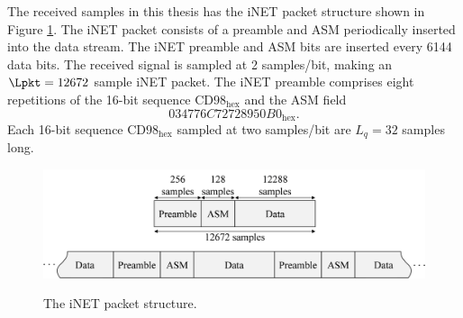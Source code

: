 The received samples in this thesis has the iNET packet structure shown in Figure \ref{fig:packet}.
The iNET packet consists of a preamble and ASM periodically inserted into the data stream.
The iNET preamble and ASM bits are inserted every 6144 data bits.
The received signal is sampled at 2 samples/bit, making an $\Lpkt=12672$ sample iNET packet.
The iNET preamble comprises eight repetitions of the 16-bit sequence $\text{CD98}_\text{hex}$ and the ASM field
\begin{equation}
034776C72728950B0_\text{hex}.
\end{equation}
Each 16-bit sequence $\text{CD98}_\text{hex}$ sampled at two samples/bit are $L_q=32$ samples long.
\begin{figure}
	\centering\includegraphics[width=9.47in/100*55]{figures/systemOverview/packetStructure.pdf}
	\label{fig:packet}
	\caption{The iNET packet structure.}
\end{figure}


